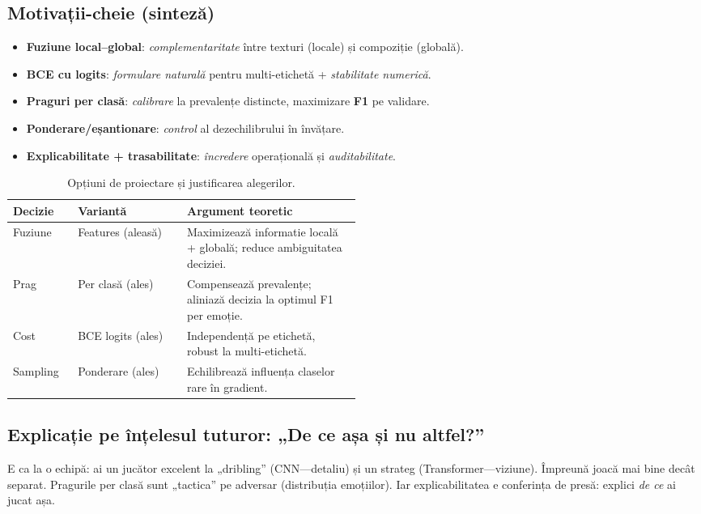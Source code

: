 \subsection{Motivații-cheie (sinteză)}
\begin{itemize}
  \item \textbf{Fuziune local–global}: \emph{complementaritate} între texturi (locale) și compoziție (globală).
  \item \textbf{BCE cu logits}: \emph{formulare naturală} pentru multi-etichetă + \emph{stabilitate numerică}.
  \item \textbf{Praguri per clasă}: \emph{calibrare} la prevalențe distincte, maximizare \textbf{F1} pe validare.
  \item \textbf{Ponderare/eșantionare}: \emph{control} al dezechilibrului în învățare.
  \item \textbf{Explicabilitate + trasabilitate}: \emph{încredere} operațională și \emph{auditabilitate}.
\end{itemize}

\begin{table}[h]
\centering
\begin{tabular}{l l p{0.5\linewidth}}
\hline
\textbf{Decizie} & \textbf{Variantă} & \textbf{Argument teoretic} \\
\hline
Fuziune & Features (aleasă) & Maximizează informatie locală + globală; reduce ambiguitatea deciziei. \\
Prag & Per clasă (ales) & Compensează prevalențe; aliniază decizia la optimul F1 per emoție. \\
Cost & BCE logits (ales) & Independență pe etichetă, robust la multi-etichetă. \\
Sampling & Ponderare (ales) & Echilibrează influența claselor rare în gradient. \\
\hline
\end{tabular}
\caption{Opțiuni de proiectare și justificarea alegerilor.}
\label{tab:design}
\end{table}

\subsection{Explicație pe înțelesul tuturor: „De ce așa și nu altfel?”}
E ca la o echipă: ai un jucător excelent la „dribling” (CNN—detaliu) și un strateg (Transformer—viziune). Împreună joacă mai bine decât separat. Pragurile per clasă sunt „tactica” pe adversar (distribuția emoțiilor). Iar explicabilitatea e conferința de presă: explici \emph{de ce} ai jucat așa.

